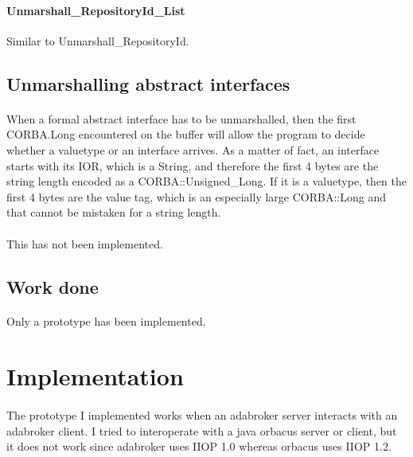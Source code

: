 \paragraph{Unmarshall\_RepositoryId\_List}Similar to Unmarshall\_RepositoryId.

\subsection{Unmarshalling abstract interfaces}
\paragraph{}When a formal abstract interface has to be unmarshalled,
then the first CORBA.Long encountered on the buffer will allow the
program to decide whether a valuetype or an interface arrives. As a
matter of fact, an interface starts with its IOR, which is a String,
and therefore the first 4 bytes are the string length encoded as a
CORBA::Unsigned\_Long. If it is a valuetype, then the first 4 bytes
are the value tag, which is an especially large CORBA::Long and that
cannot be mistaken for a string length.

\paragraph{}This has not been implemented.

\subsection{Work done}
\paragraph{}Only a prototype has been implemented.


\section{Implementation}
\paragraph{}The prototype I implemented works when an adabroker server
interacts with an adabroker client. I tried to interoperate with a
java orbacus server or client, but it does not work since adabroker
uses IIOP 1.0 whereas orbacus uses IIOP 1.2.